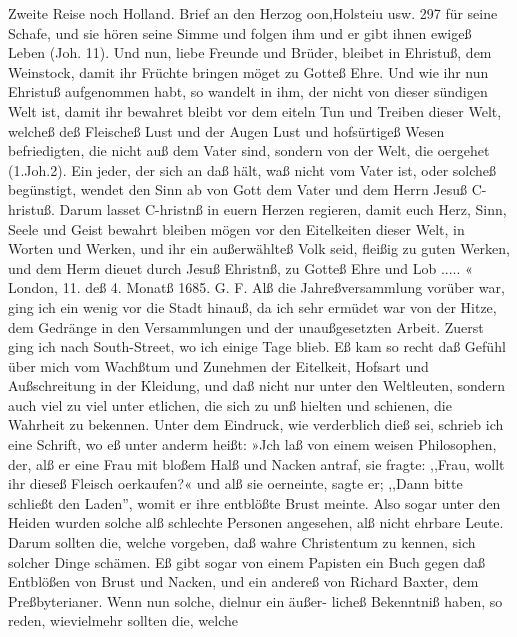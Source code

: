 Zweite Reise noch Holland. Brief an den Herzog oon,Holsteiu usw. 297
für seine Schafe, und sie hören seine Simme und folgen ihm und
er gibt ihnen ewigeß Leben (Joh. 11).
Und nun, liebe Freunde und Brüder, bleibet in Ehristuß,
dem Weinstock, damit ihr Früchte bringen möget zu Gotteß Ehre.
Und wie ihr nun Ehristuß aufgenommen habt, so wandelt in ihm,
der nicht von dieser sündigen Welt ist, damit ihr bewahret bleibt
vor dem eiteln Tun und Treiben dieser Welt, welcheß deß Fleischeß
Lust und der Augen Lust und hofsürtigeß Wesen befriedigten, die
nicht auß dem Vater sind, sondern von der Welt, die oergehet
(1.Joh.2). Ein jeder, der sich an daß hält, waß nicht vom
Vater ist, oder solcheß begünstigt, wendet den Sinn ab von Gott
dem Vater und dem Herrn Jesuß C-hristuß. Darum lasset
C-hristnß in euern Herzen regieren, damit euch Herz, Sinn,
Seele und Geist bewahrt bleiben mögen vor den Eitelkeiten dieser
Welt, in Worten und Werken, und ihr ein außerwählteß Volk
seid, fleißig zu guten Werken, und dem Herm dieuet durch Jesuß
Ehristnß, zu Gotteß Ehre und Lob ..... «
London, 11. deß 4. Monatß 1685. G. F.
Alß die Jahreßversammlung vorüber war, ging ich ein wenig
vor die Stadt hinauß, da ich sehr ermüdet war von der Hitze,
dem Gedränge in den Versammlungen und der unaußgesetzten
Arbeit. Zuerst ging ich nach South-Street, wo ich einige Tage
blieb. Eß kam so recht daß Gefühl über mich vom Wachßtum
und Zunehmen der Eitelkeit, Hofsart und Außschreitung in der
Kleidung, und daß nicht nur unter den Weltleuten, sondern
auch viel zu viel unter etlichen, die sich zu unß hielten und schienen,
die Wahrheit zu bekennen. Unter dem Eindruck, wie verderblich
dieß sei, schrieb ich eine Schrift, wo eß unter anderm heißt:
»Jch laß von einem weisen Philosophen, der, alß er eine Frau
mit bloßem Halß und Nacken antraf, sie fragte: ,,Frau, wollt ihr
dieseß Fleisch oerkaufen?« und alß sie oerneinte, sagte er; ,,Dann
bitte schließt den Laden'', womit er ihre entblößte Brust meinte.
Also sogar unter den Heiden wurden solche alß schlechte Personen
angesehen, alß nicht ehrbare Leute. Darum sollten die, welche
vorgeben, daß wahre Christentum zu kennen, sich solcher Dinge
schämen. Eß gibt sogar von einem Papisten ein Buch gegen daß
Entblößen von Brust und Nacken, und ein andereß von Richard
Baxter, dem Preßbyterianer. Wenn nun solche, dielnur ein äußer-
licheß Bekenntniß haben, so reden, wievielmehr sollten die, welche


